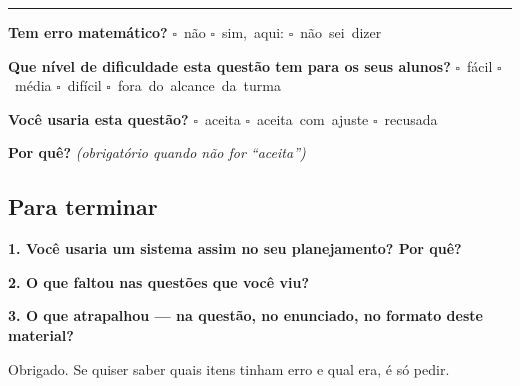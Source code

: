 \documentclass[11pt,a4paper]{article}
\begin{document}
\noindent\rule{\linewidth}{0.4pt}
\textbf{Tem erro matemático?}\quad
\mbox{$\square$~não} \quad \mbox{$\square$~sim, aqui:} \underline{\hspace{5cm}}
\quad \mbox{$\square$~não sei dizer}

\textbf{Que nível de dificuldade esta questão tem para os seus alunos?}\quad
\mbox{$\square$~fácil} \quad \mbox{$\square$~média} \quad
\mbox{$\square$~difícil} \quad \mbox{$\square$~fora do alcance da turma}

\textbf{Você usaria esta questão?}\quad
\mbox{$\square$~aceita} \quad \mbox{$\square$~aceita com ajuste} \quad
\mbox{$\square$~recusada}

\textbf{Por quê?} \emph{(obrigatório quando não for ``aceita'')}

\underline{\hspace{\linewidth}}

\underline{\hspace{\linewidth}}
\vspace{0.6em}

\newpage
\subsection*{Para terminar}

\textbf{1. Você usaria um sistema assim no seu planejamento? Por quê?}

\underline{\hspace{\linewidth}}

\underline{\hspace{\linewidth}}

\bigskip
\textbf{2. O que faltou nas questões que você viu?}

\underline{\hspace{\linewidth}}

\underline{\hspace{\linewidth}}

\bigskip
\textbf{3. O que atrapalhou --- na questão, no enunciado, no formato deste
material?}

\underline{\hspace{\linewidth}}

\underline{\hspace{\linewidth}}

\bigskip
Obrigado. Se quiser saber quais itens tinham erro e qual era, é só pedir.
\end{document}

